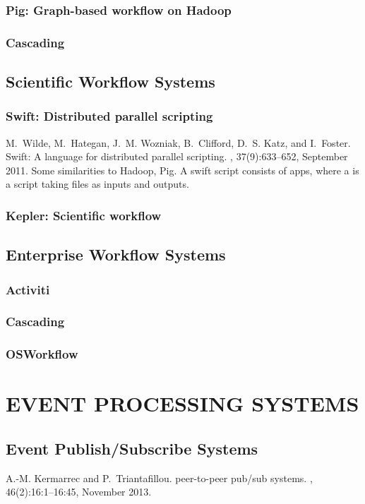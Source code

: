 \documentclass{myproc}
\begin{document}
\subsubsection{Pig: Graph-based workflow on Hadoop}
\subsubsection{Cascading}

\subsection{Scientific Workflow Systems}
\subsubsection{\textcolor{red2}{\bf{}Swift: Distributed parallel
    scripting}}
\bit
\w M.~Wilde, M.~Hategan, J.~M. Wozniak, B.~Clifford, D.~S. Katz, and I.~Foster.
\newblock Swift: A language for distributed parallel scripting.
, 37(9):633--652, September 2011.
\w Some similarities to Hadoop, Pig.
\w A swift script consists of apps, where a  is a script taking files as
    inputs and outputs.
\eit
\subsubsection{Kepler: Scientific workflow}
\subsection{Enterprise Workflow Systems}

\subsubsection{Activiti}
\subsubsection{Cascading}
\subsubsection{OSWorkflow}
 



\section{EVENT PROCESSING SYSTEMS}
\subsection{Event Publish/Subscribe Systems}
\bit
\w A.-M. Kermarrec and P.~Triantafillou.
 peer-to-peer pub/sub systems.
, 46(2):16:1--16:45, November 2013.
\end{document}
